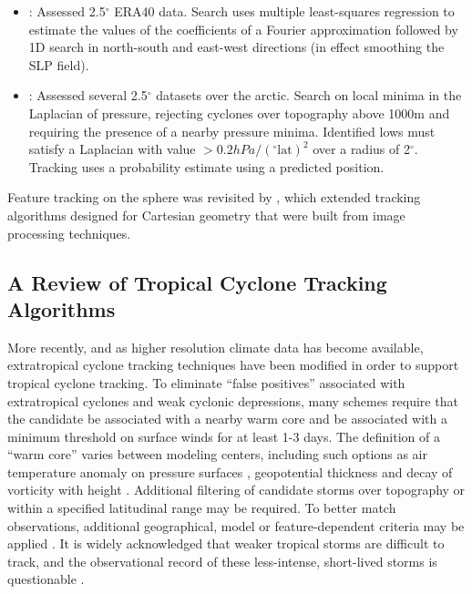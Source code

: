 \documentclass[gmdd, hvmath, online]{copernicus_discussions}
\begin{document}
\begin{itemize}
\item \cite{benestad2006use}:  Assessed 2.5$^\circ$ ERA40 data.  Search uses multiple least-squares regression to estimate the values of the coefficients of a Fourier approximation followed by 1D search in north-south and east-west directions (in effect smoothing the SLP field).

\item \cite{simmonds2008arctic}:  Assessed several 2.5$^\circ$ datasets over the arctic.  Search on local minima in the Laplacian of pressure, rejecting cyclones over topography above 1000m and requiring the presence of a nearby pressure minima.  Identified lows must satisfy a Laplacian with value $> 0.2 hPa / (^\circ \mbox{lat})^2$ over a radius of 2$^\circ$.  Tracking uses a probability estimate using a predicted position.


\end{itemize}

Feature tracking on the sphere was revisited by \cite{hodges1995feature}, which extended tracking algorithms designed for Cartesian geometry \cite{hodges1994general} that were built from image processing techniques.

\subsection{A Review of Tropical Cyclone Tracking Algorithms} \label{sec:TropicalCycloneAlgorithms}

More recently, and as higher resolution climate data has become available, extratropical cyclone tracking techniques have been modified in order to support tropical cyclone tracking.  To eliminate ``false positives'' associated with extratropical cyclones and weak cyclonic depressions, many schemes require that the candidate be associated with a nearby warm core and be associated with a minimum threshold on surface winds for at least 1-3 days.  The definition of a ``warm core'' varies between modeling centers, including such options as air temperature anomaly on pressure surfaces \citep{vitart1997simulation,zhao2009simulations,murakami2012future}, geopotential thickness \citep{tsutsui1996simulated} and decay of vorticity with height \citep{Bengtsson2007,strachan2013investigating}.  Additional filtering of candidate storms over topography or within a specified latitudinal range may be required.  To better match observations, additional geographical, model or feature-dependent criteria may be applied \citep{camargo2002improving,walsh2007objectively,Murakami2010,Murakami2012}. It is widely acknowledged that weaker tropical storms are difficult to track, and the observational record of these less-intense, short-lived storms is questionable \citep{Landsea2010}.
\end{document}
